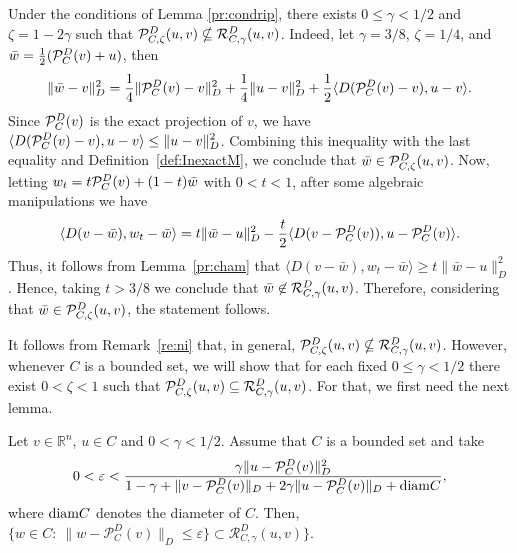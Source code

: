 \begin{remark} \label{re:ni}
	Under the conditions of  Lemma \ref{pr:condrip}, there exists  $0 \leq \gamma <1/2$ and $\zeta=1-2\gamma$ such that ${\cal P}_{C,\zeta}^{D}(u, v)  \nsubseteq    {\cal R}_{C,\gamma}^{D}(u, v)$. Indeed,  let $\gamma=3/8$, $\zeta=1/4$,  and ${\bar w}=\frac{1}{2}({\cal P}_{C}^{D}(v)+u)$, then
	$$
		\displaystyle\|{\bar w}-v\|_D^2=\frac{1}{4}\| {\cal P}_{C}^{D}(v)-v\|_D^2 + \frac{1}{4}\|u-v\|_D^2 +\frac{1}{2} \langle D( {\cal P}_{C}^{D}(v) -v), u-v \rangle.
	$$
	Since  $ {\cal P}_{C}^{D}(v)$ is the exact projection of $v$,  we have   $\displaystyle\langle D( {\cal P}_{C}^{D}(v) -v), u-v \rangle \leq \|u-v\|_D^2$. Combining this inequality with  the last equality and Definition~\ref{def:InexactM}, we conclude that ${\bar w}\in {\cal P}_{C,\zeta}^{D}(u, v)$. Now,  letting $w_t=t{\cal P}_{C}^{D}(v)+ (1-t){\bar w}$  with $0<t<1$, after some algebraic  manipulations  we have
	$$
		\langle D(v-{\bar w}), w_t-{\bar w} \rangle=t\| {\bar w}-u\|_D^2 - \frac{t}{2} \langle D( v- {\cal P}_{C}^{D}(v)) , u-{\cal P}_{C}^{D}(v)  \rangle.
	$$
	Thus, it follows from Lemma~\ref{pr:cham} that $\displaystyle \langle D(v-{\bar w}), w_t-{\bar w} \rangle\geq t\| {\bar w}-u\|_D^2 $.  Hence,  taking  $t>3/8$ we conclude that ${\bar w}\not\in{\cal R}_{C,\gamma}^{D}(u, v)$.  Therefore, considering that ${\bar w}\in {\cal P}_{C,\zeta}^{D}(u, v)$, the statement follows.
\end{remark}
It follows from Remark~\ref{re:ni} that, in general,  ${\cal P}_{C,\zeta}^{D}(u, v)  \nsubseteq    {\cal R}_{C,\gamma}^{D}(u, v)$. However, whenever $C$ is a bounded set,  we will show  that   for each  fixed  $0 \leq \gamma <1/2$  there exist $0 < \zeta  <1$ such that    ${\cal P}_{C,\zeta}^{D}(u, v)  \subseteq    {\cal R}_{C,\gamma}^{D}(u, v)$. For that, we first need the next lemma.
\begin{lemma} \label{le:epsi}
	Let $v \in {\mathbb R}^n$, $u \in C$ and $0<\gamma < 1/2$. Assume that $C$ is a bounded set and take
	\begin{equation} \label{eq:epsi}
		0<\varepsilon < \frac{\gamma \|u-\mathcal{P}_C^D(v)\|_D^2}{1-\gamma+\|v-\mathcal{P}_C^D(v)\|_D+ 2	\gamma\|u-\mathcal{P}_C^D(v)\|_D+\mbox{\normalfont diam}C },
	\end{equation}
	where $\mbox{\normalfont diam}C$ denotes the diameter of $C$. Then, $\{w\in C: ~ \|w-\mathcal{P}_C^D(v)\|_D\leq \varepsilon\}\subset\mathcal{R}_{C,\gamma}^D(u, v)\}$.
\end{lemma}
